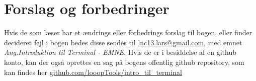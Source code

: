 \section*{Forslag og forbedringer}
Hvis de som læser har et ændrings eller forbedrings forslag til bogen, eller finder decideret fejl i bogen bedes disse sendes til \href{mailto:lnc13.lars@gmail.com}{lnc13.lars@gmail.com}, med emnet \emph{Ang.Introduktion til Terminal - \textit{EMNE}}. Hvis de er i besiddelse af en github konto, kan der også oprettes en sag på 
bogens offentlig github repository, som kan findes her \href{https://github.com/looopTools/intro\_til\_terminal}{github.com/looopTools/intro\_til\_terminal}